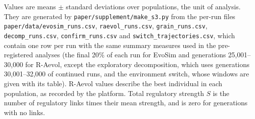 


Values are means $\pm$ standard deviations over populations, the unit of
analysis. They are generated by \texttt{paper/supplement/make\_s3.py} from the
per-run files \texttt{paper/data/evosim\_runs.csv}, \texttt{raevol\_runs.csv},
\texttt{grain\_runs.csv}, \texttt{decomp\_runs.csv}, \texttt{confirm\_runs.csv} and \texttt{switch\_trajectories.csv},
which contain one row per run with the same summary measures used in the
pre-registered analyses (the final 20\% of each run for EvoSim and generations
25{,}001--30{,}000 for R-Aevol, except the exploratory decomposition, which uses
generations 30{,}001--32{,}000 of continued runs, and the environment switch,
whose windows are given with its table). R-Aevol values describe the best
individual in each population, as recorded by the platform. Total regulatory
strength $S$ is the number of regulatory links times their mean strength, and is
zero for generations with no links.





